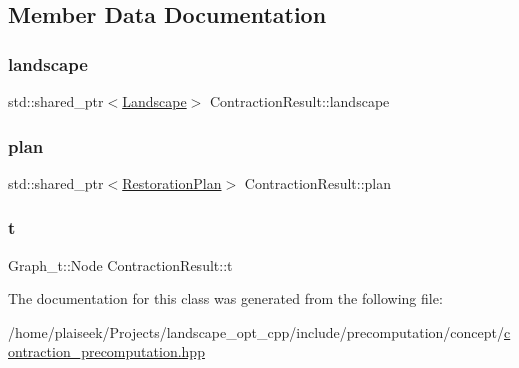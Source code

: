 \subsection{Member Data Documentation}
\mbox{\label{class_contraction_result_ab2693f752e287b3f6d031e80f0368240}} 
\subsubsection{\texorpdfstring{landscape}{landscape}}
{\footnotesize\ttfamily std\+::shared\+\_\+ptr$<$\hyperlink{class_landscape}{Landscape}$>$ Contraction\+Result\+::landscape}

\mbox{\label{class_contraction_result_aa684d24bad0d74858c604bb4dc070aa3}} 
\subsubsection{\texorpdfstring{plan}{plan}}
{\footnotesize\ttfamily std\+::shared\+\_\+ptr$<$\hyperlink{class_restoration_plan}{Restoration\+Plan}$>$ Contraction\+Result\+::plan}

\mbox{\label{class_contraction_result_a73086d90a83967d2cf24c7dd9fc83cd9}} 
\subsubsection{\texorpdfstring{t}{t}}
{\footnotesize\ttfamily Graph\+\_\+t\+::\+Node Contraction\+Result\+::t}



The documentation for this class was generated from the following file\+:\begin{DoxyCompactItemize}
\item 
/home/plaiseek/\+Projects/landscape\+\_\+opt\+\_\+cpp/include/precomputation/concept/\hyperlink{contraction__precomputation_8hpp}{contraction\+\_\+precomputation.\+hpp}\end{DoxyCompactItemize}
